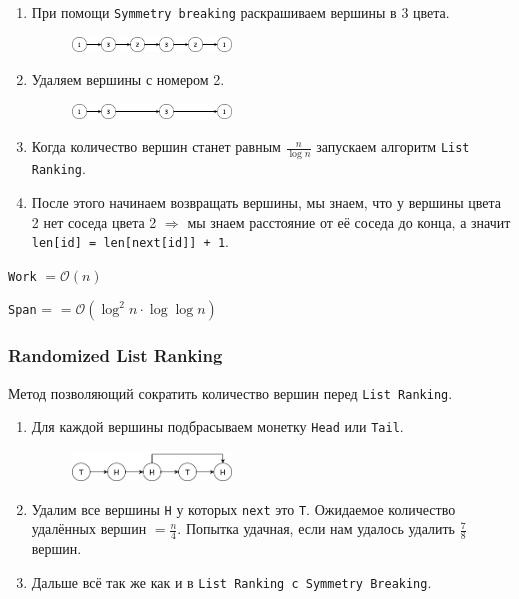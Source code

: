 \documentclass[11pt]{article}
\begin{document}
    \begin{enumerate}
        \item При помощи \texttt{Symmetry breaking} раскрашиваем вершины в 3 цвета.
        \begin{figure}[h!]
            \centering
            \includegraphics[width=0.4\textwidth]{Pictures/List Ranking/Symmetry breaking list ranking}
            \label{fig:symmetry_breaking_list_ranking}
        \end{figure}
        \item Удаляем вершины с номером 2.
        \begin{figure}[h!]
            \centering
            \includegraphics[width=0.4\textwidth]{Pictures/List Ranking/Deleting nodes}
            \label{fig:deleting_nodes_list_ranking}
        \end{figure}
        \item Когда количество вершин станет равным $\frac{n}{\log{n}}$ запускаем алгоритм \texttt{List Ranking}.
        \item После этого начинаем возвращать вершины, мы знаем, что у вершины цвета 2 нет соседа цвета 2 $\Rightarrow$ мы знаем расстояние от её соседа до конца, а значит \texttt{len[id] = len[next[id]] + 1}.
    \end{enumerate}

    \texttt{Work} $= \mathcal{O}(n)$

    \texttt{Span} = $= \mathcal{O}(\log^2{n} \cdot \log{\log{n}})$

    \subsubsection*{Randomized List Ranking}

    Метод позволяющий сократить количество вершин перед \texttt{List Ranking}.

    \begin{enumerate}
        \item Для каждой вершины подбрасываем монетку \texttt{Head} или \texttt{Tail}.
        \begin{figure}[h!]
            \centering
            \includegraphics[width=0.4\textwidth]{Pictures/List Ranking/Randomized List Ranking}
            \label{fig:head_tail}
        \end{figure}
        \item Удалим все вершины \texttt{H} у которых \texttt{next} это \texttt{T}.
        Ожидаемое количество удалённых вершин $= \frac{n}{4}$.
        Попытка удачная, если нам удалось удалить $\frac{7}{8}$ вершин.
        \item Дальше всё так же как и в \texttt{List Ranking с Symmetry Breaking}.
    \end{enumerate}
\end{document}
